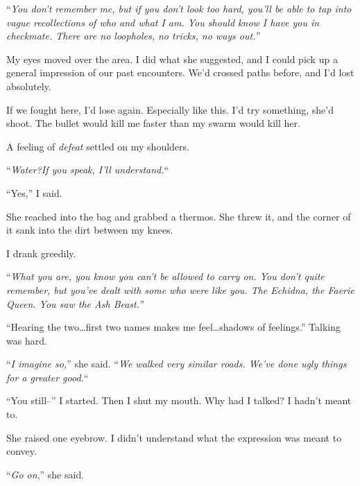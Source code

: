 ``\emph{You don't remember me, but if you don't look too hard, you'll be able to tap into vague recollections of who and what I am.  You should know I have you in checkmate.  There are no loopholes, no tricks, no ways out.''}



My eyes moved over the area.  I did what she suggested, and I could pick up a general impression of our past encounters.  We'd crossed paths before, and I'd lost absolutely.



If we fought here, I'd lose again.  Especially like this.  I'd try something, she'd shoot.  The bullet would kill me faster than my swarm would kill her.



A feeling of \emph{defeat} settled on my shoulders.



``\emph{Water?}\emph{If you speak, I'll understand.}``



``Yes,'' I said.



She reached into the bag and grabbed a thermos.  She threw it, and the corner of it sank into the dirt between my knees.



I drank greedily.



``\emph{What you are, you know you can't be allowed to carry on.  You don't quite remember, but you've dealt with some who were like you.  The Echidna, the Faerie Queen.  You saw the Ash Beast.''}



``Hearing the two\ldots first two names makes me feel\ldots shadows of feelings.''  Talking was hard.



``\emph{I imagine so,}'' she said.  ``\emph{We walked very similar roads.  We've done ugly things for a greater good.}``



``You still--'' I started.  Then I shut my mouth.  Why had I talked?  I hadn't meant to.



She raised one eyebrow.  I didn't understand what the expression was meant to convey.



``\emph{Go on},'' she said.




